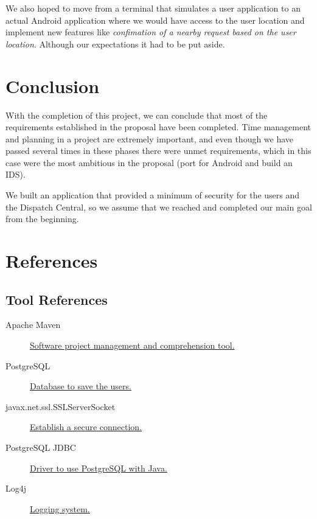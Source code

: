 \documentclass[a4paper,titlepage,11pt]{article}
\begin{document}
We also hoped to move from a terminal that simulates a user application to an actual Android application where we would have access to
the user location and implement new features like \textit{confimation of a nearby request based on the user location}. Although our
expectations it had to be put aside.

\section{Conclusion}
With the completion of this project, we can conclude that most of the requirements established in the proposal have been completed.
Time management and planning in a project are extremely important, and even though we have passed several times in these phases
there were unmet requirements, which in this case were the most ambitious in the proposal (port for Android and build an IDS).

We built an application that provided a minimum of security for the users and the Dispatch Central, so we assume that we reached
and completed our main goal from the beginning.

\section{References}

\subsection{Tool References}
\begin{description}
  \item [Apache Maven] \href{https://maven.apache.org}{Software project management and comprehension tool.}
  \item [PostgreSQL] \href{https://www.postgresql.org}{Database to save the users.}
  \item [javax.net.ssl.SSLServerSocket] \href{https://docs.oracle.com/javase/7/docs/api/java/net/Socket.html}{Establish a secure connection.}
  \item [PostgreSQL JDBC] \href{https://jdbc.postgresql.org}{Driver to use PostgreSQL with Java.}
  \item [Log4j] \href{http://logging.apache.org/log4j/2.x/}{Logging system.}
\end{description}
\end{document}
